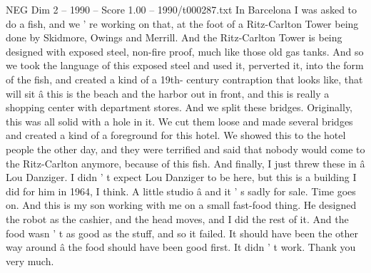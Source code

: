 \begin{textsample}{NEG Dim 2 – 1990 – Score 1.00 – 1990/t000287.txt}
In Barcelona I was asked to do a fish, and we ' re working on that, at the foot of a Ritz-Carlton Tower being done by Skidmore, Owings and Merrill.
And the Ritz-Carlton Tower is being designed with exposed steel, non-fire proof, much like those old gas tanks.
And so we took the language of this exposed steel and used it, perverted it, into the form of the fish, and created a kind of a 19th- century contraption that looks like, that will sit â this is the beach and the harbor out in front, and this is really a shopping center with department stores.
And we split these bridges.
Originally, this was all solid with a hole in it.
We cut them loose and made several bridges and created a kind of a foreground for this hotel.
We showed this to the hotel people the other day, and they were terrified and said that nobody would come to the Ritz-Carlton anymore, because of this fish.
And finally, I just threw these in â Lou Danziger.
I didn ' t expect Lou Danziger to be here, but this is a building I did for him in 1964, I think.
A little studio â and it ' s sadly for sale.
Time goes on.
And this is my son working with me on a small fast-food thing.
He designed the robot as the cashier, and the head moves, and I did the rest of it.
And the food wasn ' t as good as the stuff, and so it failed.
It should have been the other way around â the food should have been good first.
It didn ' t work.
Thank you very much.

\end{textsample}
